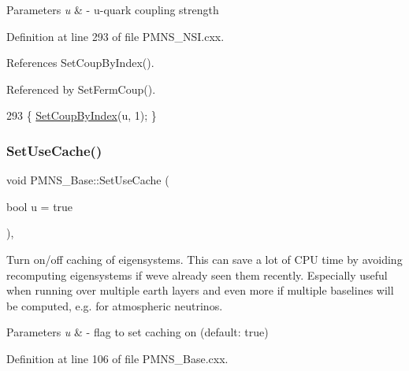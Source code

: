 \begin{DoxyParams}{Parameters}
{\em u} & -\/ u-\/quark coupling strength \\
\hline
\end{DoxyParams}


Definition at line 293 of file P\+M\+N\+S\+\_\+\+N\+S\+I.\+cxx.



References Set\+Coup\+By\+Index().



Referenced by Set\+Ferm\+Coup().


\begin{DoxyCode}
293 \{ \hyperlink{classOscProb_1_1PMNS__NSI_a276d475bbebcdf24502a5555ee65b136}{SetCoupByIndex}(u, 1); \}
\end{DoxyCode}
\mbox{\label{classOscProb_1_1PMNS__Base_aa94c1e1fff0ba731c75f7e633b023a9f}} 
\subsubsection{\texorpdfstring{Set\+Use\+Cache()}{SetUseCache()}}
{\footnotesize\ttfamily void P\+M\+N\+S\+\_\+\+Base\+::\+Set\+Use\+Cache (\begin{DoxyParamCaption}\item[{bool}]{u = {\ttfamily true} }\end{DoxyParamCaption})\hspace{0.3cm}{\ttfamily [virtual]}, {\ttfamily [inherited]}}

Turn on/off caching of eigensystems. This can save a lot of C\+PU time by avoiding recomputing eigensystems if we\textquotesingle{}ve already seen them recently. Especially useful when running over multiple earth layers and even more if multiple baselines will be computed, e.\+g. for atmospheric neutrinos.


\begin{DoxyParams}{Parameters}
{\em u} & -\/ flag to set caching on (default\+: true) \\
\hline
\end{DoxyParams}


Definition at line 106 of file P\+M\+N\+S\+\_\+\+Base.\+cxx.



